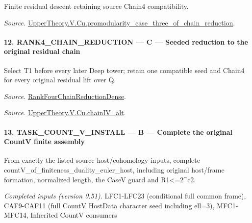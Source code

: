 Finite residual descent retaining source Chain4 compatibility.

\emph{Source.} \href{https://github.com/CocoSgt/riemann-hypothesis-lean/blob/7cbf7a0c32fca1badf05931879a37c3f8a2b03b4/src/Development/AutomorphicArithmetic/AutomorphicVarieties/ModularityArgument/ThresholdArguments/DenseThresholdCases/PromodularityCaseThreeOfLemmas.lean#L131-L153}{UpperTheory.V.Cu.promodularity\_\allowbreak case\_\allowbreak three\_\allowbreak of\_\allowbreak chain\_\allowbreak reduction}.



\paragraph{12. RANK4\_\allowbreak CHAIN\_\allowbreak REDUCTION — C — Seeded reduction to the original residual chain}

Select T1 before every later Deep tower; retain one compatible seed and Chain4 for every original residual lift over Q.

\emph{Source.} \href{https://github.com/CocoSgt/riemann-hypothesis-lean/blob/7cbf7a0c32fca1badf05931879a37c3f8a2b03b4/src/Development/AutomorphicArithmetic/AutomorphicVarieties/ModularityArgument/ThresholdArguments/DenseThresholdCases/PromodularityCaseThree.lean#L33-L39}{RankFourChainReductionDense}.

\emph{Source.} \href{https://github.com/CocoSgt/riemann-hypothesis-lean/blob/7cbf7a0c32fca1badf05931879a37c3f8a2b03b4/src/Development/AutomorphicArithmetic/AutomorphicVarieties/ModularityArgument/ThresholdArguments/DenseThresholdCases/CuPChainIV.lean#L16-L82}{UpperTheory.V.Cu.chainIV\_\allowbreak alt}.



\paragraph{13. TASK\_\allowbreak COUNT\_\allowbreak V\_\allowbreak INSTALL — B — Complete the original CountV finite assembly}

From exactly the listed source host/cohomology inputs, complete countV\_\allowbreak of\_\allowbreak finiteness\_\allowbreak duality\_\allowbreak euler\_\allowbreak host, including original host/frame formation, normalized length, the CaseV guard and R1<=2\textasciicircum{}c2.

\emph{Completed inputs (version 0.51).} LFC1-LFC23 (conditional full common frame), CAF9-CAF11 (full CountV HostData character seed including ell=3), MFC1-MFC14, Inherited CountV consumers

